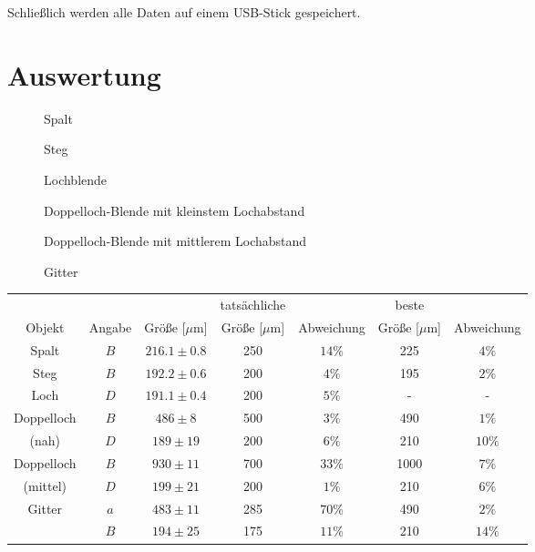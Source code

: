 \documentclass[12pt,a4paper,titlepage,headinclude,bibtotoc]{scrartcl}
\begin{document}
Schließlich werden alle Daten auf einem USB-Stick gespeichert.

\section{Auswertung}
\label{sec:auswertung}
\begin{figure}[!htb]
	\centering
	
	\caption{Spalt}
\end{figure}

\begin{figure}[!htb]
	\centering
	
	\caption{Steg}
\end{figure}

\begin{figure}[!htb]
	\centering
	
	\caption{Lochblende}
\end{figure}

\begin{figure}[!htb]
	\centering
	
	\caption{Doppelloch-Blende mit kleinstem Lochabstand}
\end{figure}

\begin{figure}[!htb]
	\centering
	
	\caption{Doppelloch-Blende mit mittlerem Lochabstand}
\end{figure}

\begin{figure}[!htb]
	\centering
	
	\caption{Gitter}
\end{figure}

\begin{table}[!htb]
	\centering
	\begin{tabular}{|c|c||c||c|c||c|c|}
		\hline
		 & & & tatsächliche &  & beste &  \\
		Objekt & Angabe & Größe [$\mu$m] & Größe [$\mu$m] & Abweichung & Größe [$\mu$m] & Abweichung \\
		\hline
		\hline
		Spalt & $B$ & $216.1 \pm 0.8$ & 250 & $14\%$ & 225 & $4\%$ \\
		Steg & $B$ & $192.2 \pm 0.6$ & 200 & $4\%$ & 195 & $2\%$ \\
		Loch & $D$ & $191.1 \pm 0.4$ & 200 & $5\%$ & - & - \\
		\hline
		Doppelloch & $B$ & $486 \pm 8$ & 500 & $3\%$ & 490 & $1\%$ \\
		(nah) & $D$ & $189 \pm 19$ & 200 & $6\%$ & 210 & $10\%$ \\
		\hline
		Doppelloch & $B$& $930 \pm 11$ & 700 & $33\%$ & 1000 & $7\%$ \\
		(mittel) & $D$& $199 \pm 21$ & 200 & $1\%$ & 210 & $6\%$ \\
		\hline		
		Gitter & $a$ & $483  \pm 11$ & 285 & $70\%$ & 490 & $2\%$ \\
		& $B$ & $194 \pm 25$ & 175 & $11\%$ & 210 & $14\%$ \\
		\hline
	\end{tabular}
\end{table}
\end{document}
